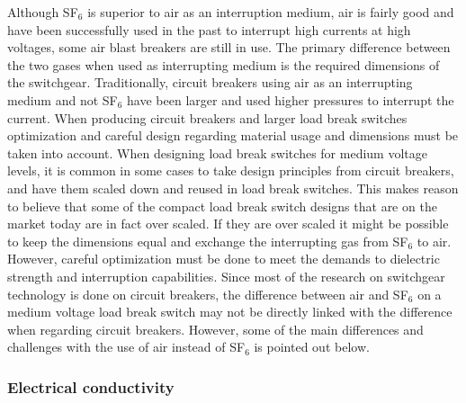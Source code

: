 \documentclass[10pt,a4paper,twoside]{article}
\begin{document}
Although SF$_6$ is superior to air as an interruption medium, air is fairly good and have been successfully used in the past to interrupt high currents at high voltages, some air blast breakers are still in use. The primary difference between the two gases when used as interrupting medium is the required dimensions of the switchgear. Traditionally, circuit breakers using air as an interrupting medium and not SF$_6$ have been larger and used higher pressures to interrupt the current. When producing circuit breakers and larger load break switches optimization and careful design regarding material usage and dimensions must be taken into account. When designing load break switches for medium voltage levels, it is common in some cases to take design principles from circuit breakers, and have them scaled down and reused in load break switches. This makes reason to believe that some of the compact load break switch designs that are on the market today are in fact over scaled. If they are over scaled it might be possible to keep the dimensions equal and exchange the interrupting gas from SF$_6$ to air. However, careful optimization must be done to meet the demands to dielectric strength and interruption capabilities. Since most of the research on switchgear technology is done on circuit breakers, the difference between air and SF$_6$ on a medium voltage load break switch may not be directly linked with the difference when regarding circuit breakers. However, some of the main differences and challenges with the use of air instead of SF$_6$ is pointed out below.

\subsubsection*{Electrical conductivity}
\end{document}
